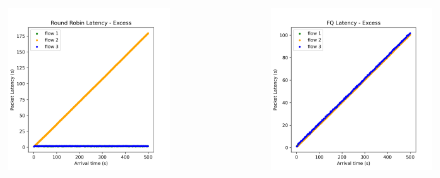 \documentclass[compress]{beamer}
\begin{document}
\begin{frame}
\begin{columns}
\begin{column}{0.32\textwidth}
\begin{figure}
                    \includegraphics[width=\textwidth]{img/rr_excess}
                \end{figure}
            \end{column}
            \begin{column}{0.32\textwidth}
                \begin{figure}
                    \centering
                    \includegraphics[width=\textwidth]{img/fq_excess}
                \end{figure}
            \end{column}
        \end{columns}
    \end{frame}
\end{document}
